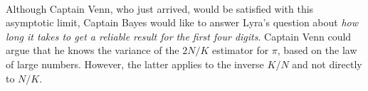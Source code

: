 \documentclass[12pt, a4paper]{scrartcl}
\begin{document}
\\

Although Captain Venn, who just arrived, would be satisfied with this
asymptotic limit, Captain Bayes would like to answer Lyra’s question about
\textit{how long it takes to get a reliable result for the first four digits}. Captain
Venn could argue that he knows the variance of the $2N/K$ estimator for
$\pi$, based on the law of large numbers. However, the latter applies to the
inverse $K/N$ and not directly to $N/K$. \\
\end{document}
